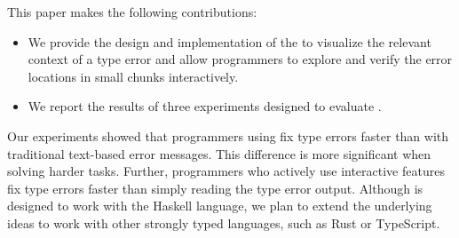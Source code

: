 This paper makes the following contributions:
\begin{itemize}
\item We provide the design and implementation of the \chameleon{} to visualize the relevant context of a type error and allow programmers to explore and verify the error locations in small chunks interactively.  
\item {
    We report the results of three experiments designed to evaluate \chameleon{}.}
\end{itemize}

Our experiments showed that programmers using \chameleon{} fix type errors faster than with traditional text-based error messages. This difference is more significant when solving harder tasks. Further, programmers who actively use \chameleon{} interactive features fix type errors faster than simply reading the type error output. Although \chameleon{} is designed to work with
the Haskell language, we plan to extend the underlying ideas to work with other strongly typed languages, such as Rust or TypeScript.